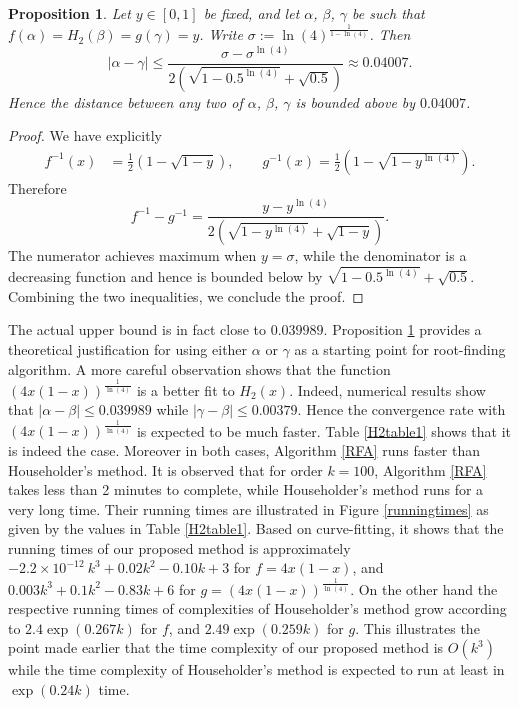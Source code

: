 \documentclass{article}
\newtheorem{proposition}[theorem]{Proposition}%
\begin{document}
\begin{proposition}\label{propjus}
	Let $y\in [0,1]$ be fixed, and let $\alpha$, $\beta$, $\gamma$ be such that $f(\alpha)=H_{2}(\beta)=g(\gamma)=y$. Write $\sigma := \ln(4)^{\frac{1}{1-\ln(4)}}$. Then 
	\[
	|\alpha-\gamma|\leq \frac{\sigma-\sigma^{\ln(4)}}{2(\sqrt{1-0.5^{\ln(4)}}+\sqrt{0.5})}\approx 0.04007.
	\]
	Hence the distance between any two of $\alpha$, $\beta$, $\gamma$ is bounded above by $0.04007$.
	\end{proposition}
	

\begin{proof}
	We have explicitly 
	\begin{equation}
		\begin{aligned}
			f^{-1}(x) &= \frac{1}{2}\left(1-\sqrt{1-y}\right),\qquad
			g^{-1}(x) = \frac{1}{2}\left(1-\sqrt{1-y^{\ln(4)}}\right).
		\end{aligned}
	\end{equation}
	Therefore 
	\[
	f^{-1}-g^{-1} = \frac{y-y^{\ln(4)}}{2\left(\sqrt{1-y^{\ln(4)}}+\sqrt{1-y}\right)}.
	\]
	The numerator achieves maximum when $y=\sigma$, while the denominator is a decreasing function and hence is bounded below by $\sqrt{1-0.5^{\ln(4)}}+\sqrt{0.5}$. Combining the two inequalities, we conclude the proof. 
\end{proof}


The actual upper bound is in fact close to $0.039989$. Proposition \ref{propjus} provides a theoretical justification for using either $\alpha$ or $\gamma$ as a starting point for root-finding algorithm. A more careful observation shows that the function $(4x(1-x))^{\frac{1}{\ln(4)}}$ is a better fit to $H_{2}(x)$. Indeed, numerical results show that $|\alpha-\beta|\leq 0.039989$ while $|\gamma-\beta|\leq 0.00379$. Hence the convergence rate with $(4x(1-x))^{\frac{1}{\ln(4)}}$ is expected to be much faster.  Table \ref{H2table1} shows that it is indeed the case.  Moreover in both cases, Algorithm \ref{RFA} runs faster than Householder's method. It is observed that for order $k=100$, Algorithm \ref{RFA} takes less than 2 minutes to complete, while Householder's method runs for a very long time. Their running times are illustrated in Figure \ref{runningtimes} as given by the values in Table \ref{H2table1}. Based on curve-fitting, it shows that the running times of our proposed method is approximately $-2.2\times 10^{-12}\ k^{3}+0.02k^2-0.10k+3$ for $f=4x(1-x)$, and $0.003k^3+0.1k^2-0.83k+6$ for $g=(4x(1-x))^{\frac{1}{\ln(4)}}$. On the other hand the respective running times of complexities of Householder's method grow according to  $2.4\exp(0.267k)$ for $f$, and $2.49\exp(0.259k)$ for $g$. This illustrates the point made earlier that the time complexity of our proposed method is $O(k^{3})$ while the time complexity of Householder's method is expected to run at least in $\exp(0.24k)$ time.
\end{document}
